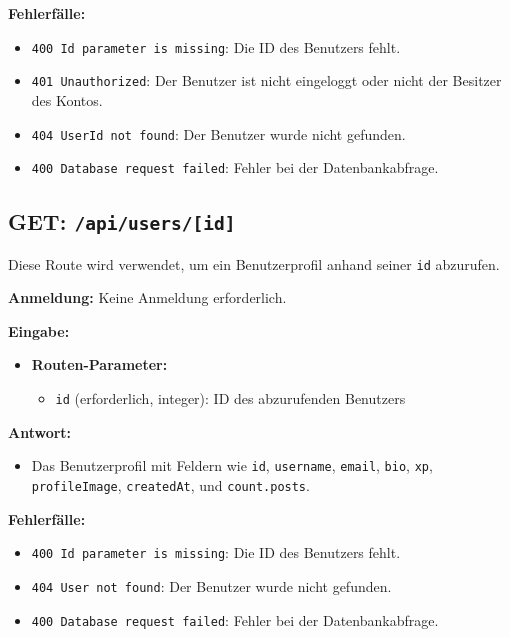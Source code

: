 \documentclass[a4paper,12pt]{article}
\begin{document}
\textbf{Fehlerfälle:}
\begin{itemize}
    \item \texttt{400 Id parameter is missing}:
        Die ID des Benutzers fehlt.
    \item \texttt{401 Unauthorized}:
        Der Benutzer ist nicht eingeloggt oder nicht der Besitzer des Kontos.
    \item \texttt{404 UserId not found}:
        Der Benutzer wurde nicht gefunden.
    \item \texttt{400 Database request failed}:
        Fehler bei der Datenbankabfrage.
\end{itemize}

\subsection{GET: \texttt{/api/users/[id]}}

Diese Route wird verwendet, um ein Benutzerprofil anhand seiner \texttt{id}
abzurufen.

\textbf{Anmeldung:} Keine Anmeldung erforderlich.

\textbf{Eingabe:}
\begin{itemize}
    \item \textbf{Routen-Parameter:}
    \begin{itemize}
        \item \texttt{id} (erforderlich, integer):
            ID des abzurufenden Benutzers
    \end{itemize}
\end{itemize}

\textbf{Antwort:}
\begin{itemize}
    \item Das Benutzerprofil mit Feldern wie
        \texttt{id},
        \texttt{username},
        \texttt{email},
        \texttt{bio},
        \texttt{xp},
        \texttt{profileImage},
        \texttt{createdAt},
        und \texttt{count.posts}.
\end{itemize}

\textbf{Fehlerfälle:}
\begin{itemize}
    \item \texttt{400 Id parameter is missing}:
        Die ID des Benutzers fehlt.
    \item \texttt{404 User not found}:
        Der Benutzer wurde nicht gefunden.
    \item \texttt{400 Database request failed}:
        Fehler bei der Datenbankabfrage.
\end{itemize}
\end{document}
